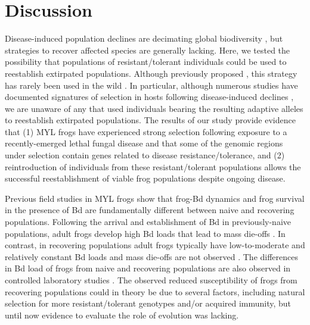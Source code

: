 \documentclass[9pt,twocolumn,twoside,lineno]{pnas-new}
\begin{document}
\section*{Discussion}

Disease-induced population declines are decimating global biodiversity
\citep{daszak2000}, but strategies to recover affected species are
generally lacking. Here, we tested the possibility that populations of
resistant/tolerant individuals could be used to reestablish extirpated
populations. Although previously proposed
\citep{mendelson2019, scheele2021}, this strategy has rarely been used
in the wild \citep[see][ for a small-scale example]{joseph2018}. In
particular, although numerous studies have documented signatures of
selection in hosts following disease-induced declines
\citep[e.g.,][]{epstein2016, gignoux-wolfsohn2021}, we are unaware of
any that used individuals bearing the resulting adaptive alleles to
reestablish extirpated populations. The results of our study provide
evidence that (1) MYL frogs have experienced strong selection following
exposure to a recently-emerged lethal fungal disease and that some of
the genomic regions under selection contain genes related to disease
resistance/tolerance, and (2) reintroduction of individuals from these
resistant/tolerant populations allows the successful reestablishment of
viable frog populations despite ongoing disease.

Previous field studies in MYL frogs show that frog-Bd dynamics and frog
survival in the presence of Bd are fundamentally different between naive
and recovering populations. Following the arrival and establishment of
Bd in previously-naive populations, adult frogs develop high Bd loads
that lead to mass die-offs \citep{vredenburg2010}. In contrast, in
recovering populations adult frogs typically have low-to-moderate and
relatively constant Bd loads and mass die-offs are not observed
\citep[see also
Figure S5]{briggs2010, knapp2011}. The
differences in Bd load of frogs from naive and recovering populations
are also observed in controlled laboratory studies \citep[see Figure 4
in][]{knapp2016}. The observed reduced susceptibility of frogs from
recovering populations could in theory be due to several factors,
including natural selection for more resistant/tolerant genotypes and/or
acquired immunity, but until now evidence to evaluate the role of
evolution was lacking.
\end{document}
